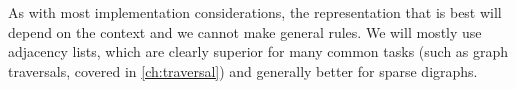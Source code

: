 As with most implementation considerations, the representation that is best will depend on the context and we cannot make general rules.  We will mostly use adjacency lists, which are
clearly superior for many common tasks (such as graph traversals, covered
in \cref{ch:traversal}) and generally better for sparse digraphs.


%

